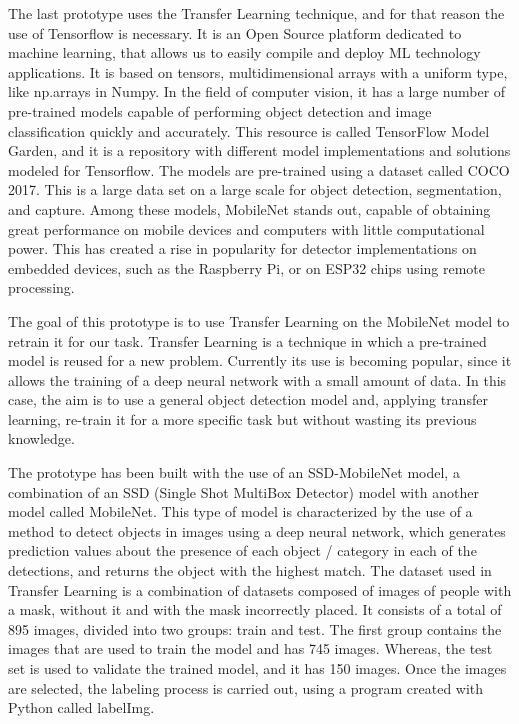 \vspace{-0.3cm}
The last prototype uses the Transfer Learning technique, and for that reason the use of Tensorflow is necessary. It is an Open Source platform dedicated to machine learning, that allows us to easily compile and deploy ML technology applications. It is based on tensors, multidimensional arrays with a uniform type, like np.arrays in Numpy. In the field of computer vision, it has a large number of pre-trained models capable of performing object detection and image classification quickly and accurately. This resource is called TensorFlow Model Garden, and it is a repository with different model implementations and solutions modeled for Tensorflow. The models are pre-trained using a dataset called COCO 2017. This is a large data set on a large scale for object detection, segmentation, and capture. Among these models, MobileNet stands out, capable of obtaining great performance on mobile devices and computers with little computational power. This has created a rise in popularity for detector implementations on embedded devices, such as the Raspberry Pi, or on ESP32 chips using remote processing.

\vspace{-0.3cm}
The goal of this prototype is to use Transfer Learning on the MobileNet model to retrain it for our task. Transfer Learning is a technique in which a pre-trained model is reused for a new problem. Currently its use is becoming popular, since it allows the training of a deep neural network with a small amount of data. In this case, the aim is to use a general object detection model and, applying transfer learning, re-train it for a more specific task but without wasting its previous knowledge. 

\vspace{-0.3cm}
The prototype has been built with the use of an SSD-MobileNet model, a combination of an SSD (Single Shot MultiBox Detector) model with another model called MobileNet. This type of model is characterized by the use of a method to detect objects in images using a deep neural network, which generates prediction values about the presence of each object / category in each of the detections, and returns the object with the highest match. The dataset used in Transfer Learning is a combination of datasets composed of images of people with a mask, without it and with the mask incorrectly placed. It consists of a total of 895 images, divided into two groups: train and test. The first group contains the images that are used to train the model and has 745 images. Whereas, the test set is used to validate the trained model, and it has 150 images. Once the images are selected, the labeling process is carried out, using a program created with Python called labelImg. 

